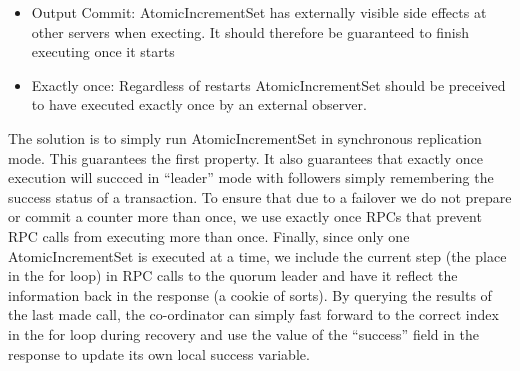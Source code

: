 \documentclass[twocolumn]{article}
\begin{document}
\begin{itemize}
  \item Output Commit: AtomicIncrementSet has externally visible side effects at
    other servers when execting. It should therefore be guaranteed to finish
    executing once it starts
  \item Exactly once: Regardless of restarts AtomicIncrementSet should be
    preceived to have executed exactly once by an external observer.
\end{itemize}

The solution is to simply run AtomicIncrementSet in synchronous replication
mode. This guarantees the first property. It also guarantees that exactly once
execution will succced in ``leader'' mode with followers simply remembering the
success status of a transaction. To ensure that due to a failover we do not
prepare or commit a counter more than once, we use exactly once RPCs that
prevent RPC calls from executing more than once. Finally, since only
one AtomicIncrementSet is executed at a time, we include the current step (the
place in the for loop) in RPC calls to the quorum leader and have it reflect the
information back in the response (a cookie of sorts). By querying the results of
the last made call, the co-ordinator can simply fast forward to the correct
index in the for loop during recovery and use the value of the ``success'' field
in the response to update its own local success variable.
\end{document}
